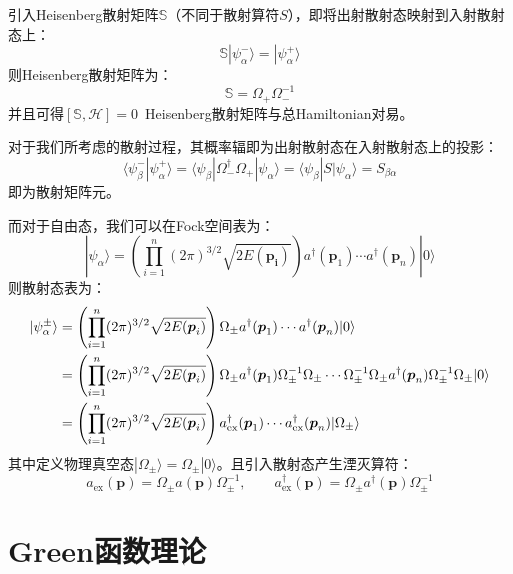 引入Heisenberg散射矩阵$\mathbb{S}$（不同于散射算符$S$），即将出射散射态映射到入射散射态上：
\begin{equation}
\mathbb{S}|\psi^{-}_\alpha\rangle=|\psi^{+}_\alpha\rangle
\end{equation}
则Heisenberg散射矩阵为：
\begin{equation}
\mathbb{S}=\Omega_+\Omega_-^{-1}
\end{equation}
并且可得$[\mathbb{S},\mathcal{H}]=0$~Heisenberg散射矩阵与总Hamiltonian对易。

对于我们所考虑的散射过程，其概率辐即为出射散射态在入射散射态上的投影：
\begin{equation}
\langle\psi^{-}_\beta|\psi^{+}_\alpha\rangle=\langle\psi_\beta|\Omega_-^\dagger\Omega_+|\psi_\alpha\rangle=\langle\psi_\beta|S|\psi_\alpha\rangle=S_{\beta\alpha}
\end{equation}
即为散射矩阵元。

而对于自由态，我们可以在Fock空间表为：
\begin{equation}
|\psi_\alpha\rangle=\left(\prod_{i=1}^{n}(2\pi)^{3/2}\sqrt{2E(\boldsymbol{p_i})}\right) a^\dagger(\boldsymbol{p}_1)\cdots a^\dagger(\boldsymbol{p}_n)|0\rangle
\end{equation}
则散射态表为：
	\begin{align}
	|\psi^{\pm}_\alpha\rangle&=\left(\prod_{i=1}^{n}(2\pi)^{3/2}\sqrt{2E(\boldsymbol{p}_i)}\right)\Omega_\pm a^\dagger(\boldsymbol{p}_1)\cdots a^\dagger(\boldsymbol{p}_n)|0\rangle\notag\\
	&=\left(\prod_{i=1}^{n}(2\pi)^{3/2}\sqrt{2E(\boldsymbol{p}_i)}\right)\Omega_\pm a^\dagger(\boldsymbol{p}_1)\Omega_\pm^{-1}\Omega_\pm\cdots \Omega_\pm^{-1}\Omega_\pm a^\dagger(\boldsymbol{p}_n)\Omega_\pm^{-1}\Omega_\pm|0\rangle\notag\\
	&=\left(\prod_{i=1}^{n}(2\pi)^{3/2}\sqrt{2E(\boldsymbol{p}_i)}\right)a_{\text{ex}}^\dagger(\boldsymbol{p}_1)\cdots a_{\text{ex}}^\dagger(\boldsymbol{p}_n)|\Omega_\pm\rangle
	\end{align}
其中定义物理真空态$|\Omega_\pm\rangle=\Omega_\pm|0\rangle$。且引入散射态产生湮灭算符：
\begin{equation}
a_{\text{ex}}(\boldsymbol{p})=\Omega_\pm a(\boldsymbol{p})\Omega_\pm^{-1},\qquad a_{\text{ex}}^\dagger(\boldsymbol{p})=\Omega_\pm a^\dagger(\boldsymbol{p})\Omega_\pm^{-1}
\end{equation}
\section{Green函数理论}
